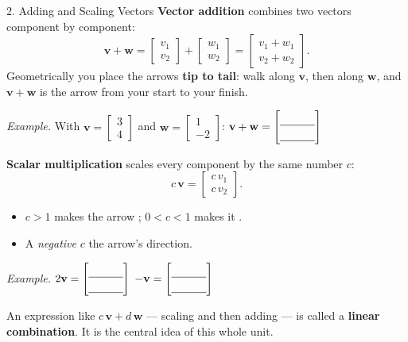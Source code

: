 \documentclass[10pt]{article}
\newcommand{\vv}{\mathbf{v}}
\newcommand{\ww}{\mathbf{w}}
\begin{document}
\begin{notesbox}{2. Adding and Scaling Vectors}
\textbf{Vector addition} combines two vectors component by component:
\[
  \vv + \ww =
  \begin{bmatrix} v_1 \\ v_2 \end{bmatrix} +
  \begin{bmatrix} w_1 \\ w_2 \end{bmatrix} =
  \begin{bmatrix} v_1 + w_1 \\ v_2 + w_2 \end{bmatrix}.
\]
Geometrically you place the arrows \textbf{tip to tail}: walk along $\vv$, then along
$\ww$, and $\vv+\ww$ is the arrow from your start to your finish.

\vspace{2pt}
\textit{Example.} With $\vv = \begin{bmatrix} 3 \\ 4 \end{bmatrix}$ and
$\ww = \begin{bmatrix} 1 \\ -2 \end{bmatrix}$:
\qquad $\vv + \ww = \begin{bmatrix}\rule{0pt}{1.1em}\blank{1.1cm}\\[2pt]\blank{1.1cm}\end{bmatrix}$

\vspace{6pt}
\textbf{Scalar multiplication} scales every component by the same number $c$:
\[
  c\,\vv = \begin{bmatrix} c\,v_1 \\ c\,v_2 \end{bmatrix}.
\]
\begin{itemize}\setlength{\itemsep}{1pt}
  \item $c>1$ makes the arrow \blank{3.0cm}; \; $0<c<1$ makes it \blank{3.0cm}.
  \item A \emph{negative} $c$ \blank{4.2cm} the arrow's direction.
\end{itemize}
\textit{Example.} $2\vv = \begin{bmatrix}\rule{0pt}{1.1em}\blank{1.1cm}\\[2pt]\blank{1.1cm}\end{bmatrix}$
\qquad
$-\vv = \begin{bmatrix}\rule{0pt}{1.1em}\blank{1.1cm}\\[2pt]\blank{1.1cm}\end{bmatrix}$

\vspace{4pt}
An expression like $c\,\vv + d\,\ww$ --- scaling and then adding --- is called a
\textbf{linear combination}. It is the central idea of this whole unit.
\end{notesbox}
\end{document}
